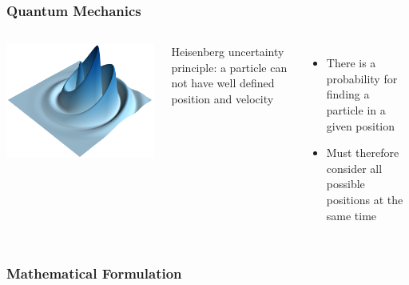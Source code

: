 \documentclass{beamer}
\begin{document}
\begin{frame}
	\frametitle{Quantum Mechanics}

	\begin{columns}
			\includegraphics[width=\textwidth]{figurer/quantum_particle}

			Heisenberg uncertainty principle: a particle can not have well defined position and velocity
			\begin{itemize}
				\item<2-> There is a probability for finding a particle in a given position
				\item<3-> Must therefore consider all possible positions at the same time
			\end{itemize}
	\end{columns}
\end{frame}


\begin{frame}
	\frametitle{Mathematical Formulation}

	
	\vspace{1cm}
\end{frame}
\end{document}
